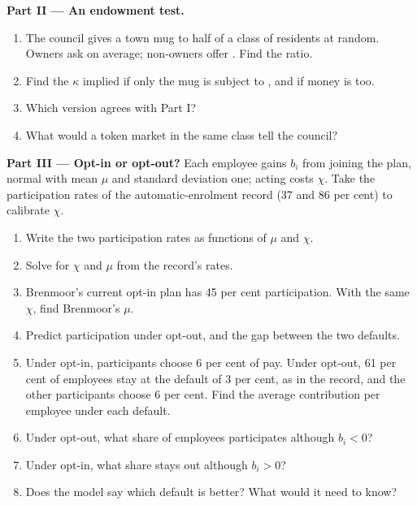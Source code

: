 \begin{problem}
\medskip
\noindent\textbf{Part II --- An endowment test.}
\begin{enumerate}[resume]
  \item The council gives a town mug to half of a class of residents at random. Owners ask  on
        average; non-owners offer . Find the ratio.
  \item Find the $\kappa$ implied if only the mug is subject to , and if money is too.
  \item Which version agrees with Part I?
  \item What would a token market in the same class tell the council?
\end{enumerate}

\medskip
\noindent\textbf{Part III --- Opt-in or opt-out?} Each employee gains $b_i$ from joining the plan, normal
with mean $\mu$ and standard deviation one; acting costs $\chi$. Take the participation rates of the
automatic-enrolment record (37 and 86 per cent) to calibrate $\chi$.
\begin{enumerate}[resume]
  \item Write the two participation rates as functions of $\mu$ and $\chi$.
  \item Solve for $\chi$ and $\mu$ from the record's rates.
  \item Brenmoor's current opt-in plan has 45 per cent participation. With the same $\chi$, find
        Brenmoor's $\mu$.
  \item Predict participation under opt-out, and the gap between the two defaults.
  \item Under opt-in, participants choose 6 per cent of pay. Under opt-out, 61 per cent of employees stay
        at the default of 3 per cent, as in the record, and the other participants choose 6 per cent.
        Find the average contribution per employee under each default.
  \item Under opt-out, what share of employees participates although $b_i < 0$?
  \item Under opt-in, what share stays out although $b_i > 0$?
  \item Does the model say which default is better? What would it need to know?
\end{enumerate}


\end{problem}
